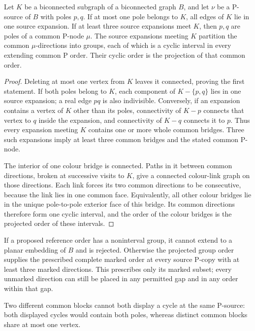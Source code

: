 \begin{lemma}
\label{gen:groups}
Let $K$ be a biconnected subgraph of a biconnected graph $B$, and let $\nu$
be a P-source of $B$ with poles $p,q$.  If at most one pole belongs to $K$,
all edges of $K$ lie in one source expansion.  If at least three source
expansions meet $K$, then $p,q$ are poles of a common P-node $\mu$.
The source expansions meeting $K$ partition the common $\mu$-directions
into groups, each of which is a cyclic interval in every extending common
P order.  Their cyclic order is the projection of that common order.
\end{lemma}

\begin{proof}
Deleting at most one vertex from $K$ leaves it connected, proving the first
statement.  If both poles belong to $K$, each component of
$K-\{p,q\}$ lies in one source expansion; a real edge $pq$ is also
indivisible.  Conversely, if an expansion contains a vertex of $K$ other
than its poles, connectivity of $K-p$ connects that vertex to $q$ inside
the expansion, and connectivity of $K-q$ connects it to $p$.  Thus every
expansion meeting $K$ contains one or more whole common bridges.
Three such expansions imply at least three common bridges and the stated
common P-node.

The interior of one colour bridge is connected.  Paths in it between
common directions, broken at successive visits to $K$, give a connected
colour-link graph on those directions.  Each link forces its two common
directions to be consecutive, because the link lies in one common face.
Equivalently, all other colour bridges lie in the unique pole-to-pole
exterior face of this bridge.  Its common directions therefore form one
cyclic interval, and the order of the colour bridges is the projected
order of these intervals.
\end{proof}

If a proposed reference order has a noninterval group, it cannot extend to
a planar embedding of $B$ and is rejected.  Otherwise the projected group
order supplies the prescribed complete marked order at every source P-copy
with at least three marked directions.  This prescribes only its marked
subset; every unmarked direction can still be placed in any permitted gap
and in any order within that gap.

Two different common blocks cannot both display a cycle at the same
P-source: both displayed cycles would contain both poles, whereas distinct
common blocks share at most one vertex.

